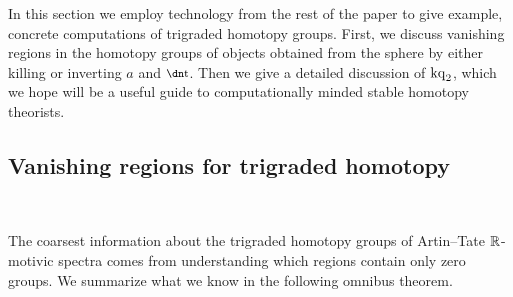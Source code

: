 In this section we employ technology from the rest of the paper to give example, concrete computations of trigraded homotopy groups.  First, we discuss vanishing regions in the homotopy groups of objects obtained from the sphere by either killing or inverting $a$ and $\ta$.  Then we give a detailed discussion of $\mathrm{kq}_2$, which we hope will be a useful guide to computationally minded stable homotopy theorists.

\subsection{Vanishing regions for trigraded homotopy}\

The coarsest information about the trigraded homotopy groups of Artin--Tate $\mathbb{R}$-motivic spectra comes from understanding which regions contain only zero groups. We summarize what we know in the following omnibus theorem.

